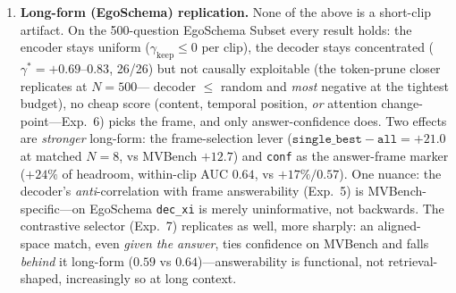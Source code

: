 \documentclass[11pt]{article}
\newcommand{\gm}{\gamma}
\newcommand{\gkeep}{\gamma_{\mathrm{keep}}}
\begin{document}
\begin{enumerate}
\begin{itemize}
            that marks the answer frame is the LLM's answer-confidence---and only weakly
            (within-clip AUC $0.57$), at the cost of a per-frame forward.
      \item \emph{Contrastive rescue.} An external contrastive (SigLIP) score, the one
            aligned-space signal Qwen lacks, clears chance only on \emph{selection-shaped}
            tasks, and even given the correct answer no more than ties confidence (Exp.~7). It
            yields at best a narrow task-gated selector, not a general one.
      \end{itemize}
      What survives is \emph{uniform / recoverable} compression: blind $\sim2\times$ temporal
      reduction (Exp.~1) and per-layer recoverable skipping, where dropped tokens remain
      available as keys rather than being ranked away.
\item \textbf{Long-form (EgoSchema) replication.} None of the above is a short-clip
      artifact. On the 500-question EgoSchema Subset every result holds: the encoder stays
      uniform ($\gkeep\le0$ per clip), the decoder stays concentrated ($\gm^{*}=+0.69$--$0.83$,
      26/26) but not causally exploitable (the token-prune closer replicates at $N{=}500$---
      decoder $\le$ random and \emph{most} negative at the tightest budget), no cheap score
      (content, temporal position, \emph{or} attention change-point---Exp.~6) picks the frame,
      and only answer-confidence does.
      Two effects are \emph{stronger} long-form: the frame-selection lever
      ($\texttt{single\_best}-\texttt{all}=+21.0$ at matched $N{=}8$, vs MVBench $+12.7$) and
      \texttt{conf} as the answer-frame marker ($+24\%$ of headroom, within-clip AUC $0.64$,
      vs $+17\%/0.57$). One nuance: the decoder's \emph{anti}-correlation with frame
      answerability (Exp.~5) is MVBench-specific---on EgoSchema \texttt{dec\_xi} is merely
      uninformative, not backwards. The contrastive selector (Exp.~7) replicates as well, more
      sharply: an aligned-space match, even \emph{given the answer}, ties confidence on MVBench
      and falls \emph{behind} it long-form ($0.59$ vs $0.64$)---answerability is functional, not
      retrieval-shaped, increasingly so at long context.
\end{enumerate}

\end{document}
